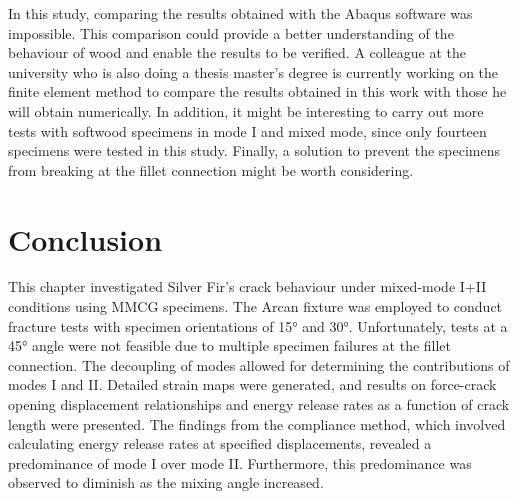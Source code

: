 In this study, comparing the results obtained with the Abaqus software was impossible. This comparison could provide a better understanding of the behaviour of wood and enable the results to be verified. A colleague at the university who is also doing a thesis master's degree is currently working on the finite element method to compare the results obtained in this work with those he will obtain numerically. In addition, it might be interesting to carry out more tests with softwood specimens in mode I and mixed mode, since only fourteen specimens were tested in this study.
Finally, a solution to prevent the specimens from breaking at the fillet connection might be worth considering.

\section{Conclusion}

This chapter investigated Silver Fir's crack behaviour under mixed-mode I+II conditions using MMCG specimens. The Arcan fixture was employed to conduct fracture tests with specimen orientations of 15° and 30°. Unfortunately, tests at a 45° angle were not feasible due to multiple specimen failures at the fillet connection. The decoupling of modes allowed for determining the contributions of modes I and II. Detailed strain maps were generated, and results on force-crack opening displacement relationships and energy release rates as a function of crack length were presented. The findings from the compliance method, which involved calculating energy release rates at specified displacements, revealed a predominance of mode I over mode II. Furthermore, this predominance was observed to diminish as the mixing angle increased.